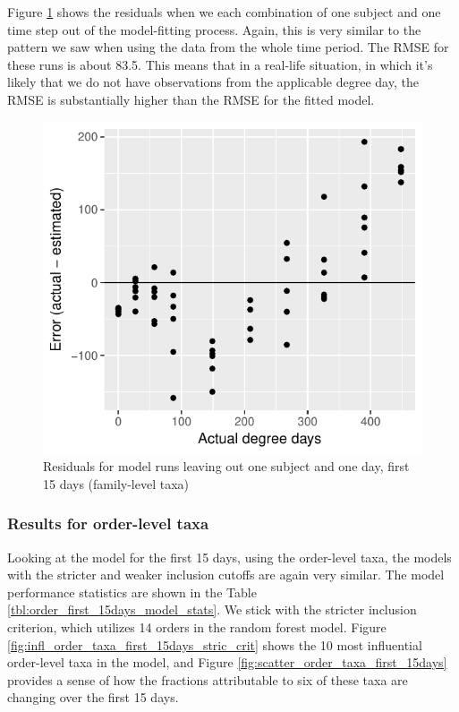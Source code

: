 \documentclass{article}
\begin{document}
Figure \ref{fig:leave_out_one_resids_family_taxa_first_15days} shows
the residuals when we each combination of one subject and one time
step out of the model-fitting process.  Again, this is very similar to
the pattern we saw when using the data from the whole time period.
The RMSE for these runs is about 83.5.  This means that in a real-life
situation, in which it's likely that we do not have observations from
the applicable degree day, the RMSE is substantially higher than the
RMSE for the fitted model.

\begin{figure}
  \centering
  \includegraphics{../../only_families/first_two_weeks/hit_1perc_twice/leave_out_one_subj_and_one_day_residuals}
  \caption{Residuals for model runs leaving out one subject and one day, first 15 days (family-level taxa)}
  \label{fig:leave_out_one_resids_family_taxa_first_15days}
\end{figure}


\subsubsection{Results for order-level taxa}

Looking at the model for the first 15 days, using the order-level
taxa, the models with the stricter and weaker inclusion cutoffs are
again very similar.  The model performance statistics are shown in the
Table \ref{tbl:order_first_15days_model_stats}.  We stick with the
stricter inclusion criterion, which utilizes 14 orders in the random
forest model.  Figure
\ref{fig:infl_order_taxa_first_15days_stric_crit} shows the 10 most
influential order-level taxa in the model, and Figure
\ref{fig:scatter_order_taxa_first_15days} provides a sense of how the
fractions attributable to six of these taxa are changing over the
first 15 days.
\end{document}
